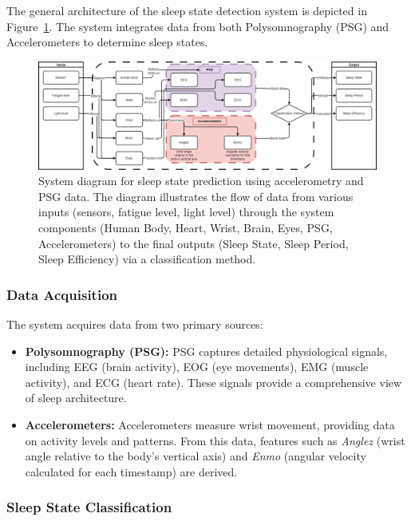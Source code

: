 \documentclass[conference]{IEEEtran}
\begin{document}
The general architecture of the sleep state detection system is depicted in Figure~\ref{fig:system-diagram}. The system integrates data from both Polysomnography (PSG) and Accelerometers to determine sleep states.

\begin{figure}[h]
    \centering
    \includegraphics[width=0.9\linewidth]{figures/sleep_system_diagram.png}
    \caption{System diagram for sleep state prediction using accelerometry and PSG data. The diagram illustrates the flow of data from various inputs (sensors, fatigue level, light level) through the system components (Human Body, Heart, Wrist, Brain, Eyes, PSG, Accelerometers) to the final outputs (Sleep State, Sleep Period, Sleep Efficiency) via a classification method.}
    \label{fig:system-diagram}
\end{figure}

\subsubsection{Data Acquisition}

The system acquires data from two primary sources:

\begin{itemize}
	\item \textbf{Polysomnography (PSG):} PSG captures detailed physiological signals, including EEG (brain activity), EOG (eye movements), EMG (muscle activity), and ECG (heart rate). These signals provide a comprehensive view of sleep architecture.
	\item \textbf{Accelerometers:} Accelerometers measure wrist movement, providing data on activity levels and patterns. From this data, features such as \textit{Anglez} (wrist angle relative to the body's vertical axis) and \textit{Enmo} (angular velocity calculated for each timestamp) are derived.
\end{itemize}

\subsubsection{Sleep State Classification}
\end{document}
